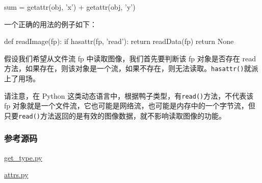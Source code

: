 \begin{pythoncode}
sum = getattr(obj, 'x') + getattr(obj, 'y')
\end{pythoncode}

一个正确的用法的例子如下：

\begin{pythoncode}
def readImage(fp):
    if hasattr(fp, 'read'):
        return readData(fp)
    return None
\end{pythoncode}

假设我们希望从文件流 fp 中读取图像，我们首先要判断该 fp 对象是否存在
read
方法，如果存在，则该对象是一个流，如果不存在，则无法读取。\texttt{hasattr()}就派上了用场。

请注意，在 Python
这类动态语言中，根据鸭子类型，有\texttt{read()}方法，不代表该 fp
对象就是一个文件流，它也可能是网络流，也可能是内存中的一个字节流，但只要\texttt{read()}方法返回的是有效的图像数据，就不影响读取图像的功能。

\hypertarget{ux53c2ux8003ux6e90ux7801}{%
\subsubsection{参考源码}\label{ux53c2ux8003ux6e90ux7801}}

\href{https://github.com/michaelliao/learn-python3/blob/master/samples/oop_basic/get_type.py}{get\_type.py}

\href{https://github.com/michaelliao/learn-python3/blob/master/samples/oop_basic/attrs.py}{attrs.py}

